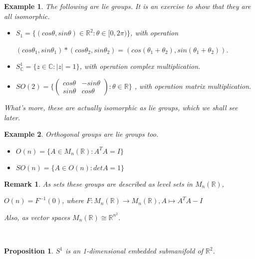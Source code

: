 \documentclass[12pt]{article}
\newcommand{\cx}{\mathbb{C}}
\newcommand{\real}{\mathbb{R}}
\newcommand{\abs}[1]{|#1|}
\newcommand\inv[1]{#1^{-1}}
\newcommand\set[1]{\{#1\}}
\newtheorem*{remark}{Remark}
\newtheorem{prop}{Proposition}[thm]
\newtheorem{example}{Example}[thm]
\begin{document}
\begin{example}
  The following are lie groups. It is an exercise to show that they are all isomorphic.
\begin{itemize}
\item
  $S_1 = \set{(cos \theta, sin \theta) \in \real^2 : \theta \in [0,2\pi)}$, with operation
  \begin{center}
    $(cos \theta_1, sin \theta_1) * (cos \theta_2, sin \theta_2) = (cos (\theta_1 + \theta_2), sin (\theta_1 + \theta_2))$.
  \end{center}
 
\item
    $S_{\cx}^1 = \set{z \in \cx : \abs{z} = 1}$, with operation complex multiplication.

\item
    $SO(2) = \set{ \begin{pmatrix}
      cos \theta & - sin \theta\\
      sin \theta & cos \theta 
    \end{pmatrix} : \theta \in \real}$
  , with operation matrix multiplication.
\end{itemize}
What's more, these are actually isomorphic as lie groups, which we shall see later. 
\end{example}

\begin{example}
  Orthogonal groups are lie groups too.
  \begin{itemize}
  \item
    $O(n) = \set{A \in M_n(\real) : A^TA = I}$
  \item
    $SO(n) = \set{A \in O(n) : det A = 1}$
  \end{itemize}
\end{example}

\begin{remark}
  As sets these  groups  are described as level sets in $M_n(\real)$,
  \begin{center}
    $O(n) = \inv{F}(0)$, where $F : M_n(\real) \to M_n(\real), A \mapsto A^TA - I$
  \end{center}
  Also, as vector spaces $M_n(\real) \cong \real^{n^2}$.
\end{remark}

\
\begin{prop}
  $S^1$ is  an 1-dimensional embedded submanifold of $\real^2$.
\end{prop}
\end{document}
